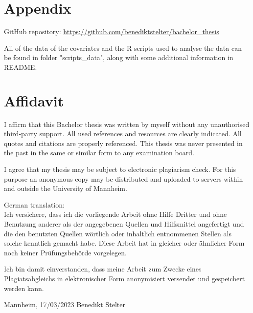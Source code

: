 \documentclass{scrbook}
\begin{document}
 
\backmatter


 
\renewcommand\refname{References}
\printbibliography[title=References]

\chapter{Appendix}
GitHub repository: \url{https://github.com/benediktstelter/bachelor_thesis}

\noindent All of the data of the covariates and the R scripts used to analyse the data can be found in folder "scripts\_data", along with some additional information in README.



\chapter{Affidavit}
\thispagestyle{empty}

I affirm that this Bachelor thesis was written by myself without any unauthorised third-party support. All used references and resources are clearly indicated. All quotes and citations are properly referenced. This thesis was never presented in the past in the same or similar form to any examination board. 

\noindent I agree that my thesis may be subject to electronic plagiarism check. For this purpose an anonymous copy may be distributed and uploaded to
servers within and outside the University of Mannheim.

\vspace{2\baselineskip}

\noindent German translation:\\
Ich versichere, dass ich die vorliegende Arbeit ohne Hilfe Dritter und ohne Benutzung anderer
als der angegebenen Quellen und Hilfsmittel angefertigt und die den benutzten Quellen
wörtlich oder inhaltlich entnommenen Stellen als solche kenntlich gemacht habe. Diese Arbeit
hat in gleicher oder ähnlicher Form noch keiner Prüfungsbehörde vorgelegen.

\noindent Ich bin damit einverstanden, dass meine Arbeit zum Zwecke eines Plagiatsabgleichs in
elektronischer Form anonymisiert versendet und gespeichert werden kann.

\vspace{4\baselineskip}
\begin{center}
\parbox{.8\textwidth}{Mannheim, 17/03/2023 \hfill Benedikt Stelter}
\end{center}


 
\end{document}
